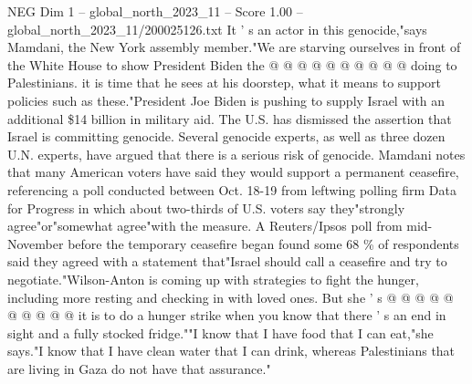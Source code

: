 \begin{textsample}{NEG Dim 1 – global\_north\_2023\_11 – Score 1.00 – global\_north\_2023\_11/200025126.txt}
It ' s an actor in this genocide,"says Mamdani, the New York assembly member."We are starving ourselves in front of the White House to show President Biden the @ @ @ @ @ @ @ @ @ @ doing to Palestinians. it is time that he sees at his doorstep, what it means to support policies such as these."President Joe Biden is pushing to supply Israel with an additional \$14 billion in military aid.
The U.S. has dismissed the assertion that Israel is committing genocide.
Several genocide experts, as well as three dozen U.N. experts, have argued that there is a serious risk of genocide.
Mamdani notes that many American voters have said they would support a permanent ceasefire, referencing a poll conducted between Oct. 18-19 from leftwing polling firm Data for Progress in which about two-thirds of U.S. voters say they"strongly agree"or"somewhat agree"with the measure.
A Reuters/Ipsos poll from mid-November before the temporary ceasefire began found some 68 \% of respondents said they agreed with a statement that"Israel should call a ceasefire and try to negotiate."Wilson-Anton is coming up with strategies to fight the hunger, including more resting and checking in with loved ones.
But she ' s @ @ @ @ @ @ @ @ @ @ it is to do a hunger strike when you know that there ' s an end in sight and a fully stocked fridge.""I know that I have food that I can eat,"she says."I know that I have clean water that I can drink, whereas Palestinians that are living in Gaza do not have that assurance."

\end{textsample}
